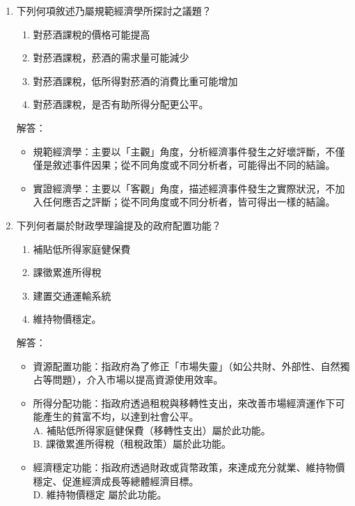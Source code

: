 \documentclass[12pt, a4paper]{article}
\begin{document}
\begin{enumerate}
    \newpage

    \item 下列何項敘述乃屬規範經濟學所探討之議題？
        \begin{enumerate}[label=\Alph*.]
            \item 對菸酒課稅的價格可能提高
            \item 對菸酒課稅，菸酒的需求量可能減少
            \item 對菸酒課稅，低所得對菸酒的消費比重可能增加
            \item 對菸酒課稅，是否有助所得分配更公平。
        \end{enumerate}
        解答：
        \begin{itemize}
            \item 規範經濟學：主要以「主觀」角度，分析經濟事件發生之好壞評斷，不僅僅是敘述事件因果；從不同角度或不同分析者，可能得出不同的結論。
            \item 實證經濟學：主要以「客觀」角度，描述經濟事件發生之實際狀況，不加入任何應否之評斷；從不同角度或不同分析者，皆可得出一樣的結論。
        \end{itemize}

    \item 下列何者屬於財政學理論提及的政府配置功能？
        \begin{enumerate}[label=\Alph*.]
            \item 補貼低所得家庭健保費
            \item 課徵累進所得稅
            \item 建置交通運輸系統
            \item 維持物價穩定。
        \end{enumerate}
        解答：
        \begin{itemize}
            \item 資源配置功能：指政府為了修正「市場失靈」（如公共財、外部性、自然獨占等問題），介入市場以提高資源使用效率。
            \item 所得分配功能：指政府透過租稅與移轉性支出，來改善市場經濟運作下可能產生的貧富不均，以達到社會公平。\\
            A. 補貼低所得家庭健保費（移轉性支出）屬於此功能。\\
            B. 課徵累進所得稅（租稅政策）屬於此功能。
            \item 經濟穩定功能：指政府透過財政或貨幣政策，來達成充分就業、維持物價穩定、促進經濟成長等總體經濟目標。\\
            D. 維持物價穩定 屬於此功能。
        \end{itemize}


\end{enumerate}
\end{document}
